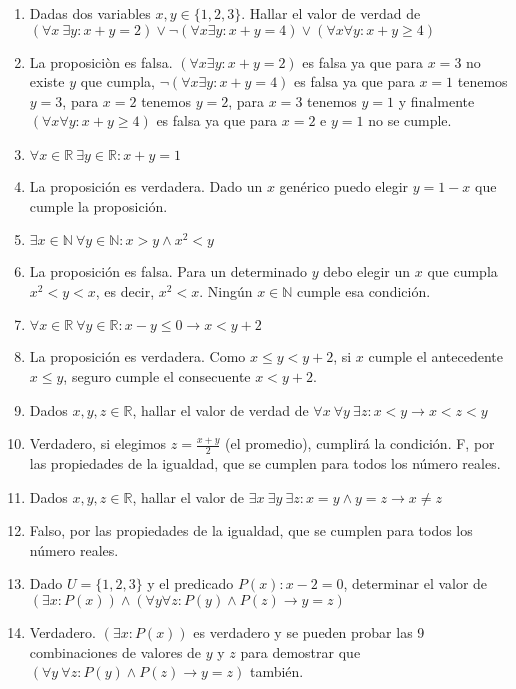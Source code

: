 \documentclass[a4paper]{article}
\newcommand{\answer}{\item[**]}
\newcommand{\then}{\to}
\begin{document}
\begin{enumerate}[resume]
\begin{enumerate} [label=(\alph*)]
		\item Dadas dos variables $x,y \in \{1,2,3\}$. Hallar el valor de verdad de $\left(\forall x ~\exists y: x+y = 2 \right) \lor \neg \left(\forall x \exists y: x+y = 4 \right) \lor \left(\forall x \forall y: x+y \geq  4 \right)$
		\answer La proposiciòn es falsa. $\left(\forall x \exists y: x+y = 2 \right)$ es falsa ya que para $x=3$ no existe $y$ que cumpla, $\neg \left(\forall x \exists y: x+y = 4 \right)$ es falsa ya que para $x=1$ tenemos $y=3$, para $x=2$ tenemos $y=2$, para $x=3$ tenemos $y=1$ y finalmente $\left(\forall x \forall y: x+y \geq  4 \right)$ es falsa ya que para $x=2$ e $y=1$ no se cumple. 

		\item $\forall x \in \mathbb{R} ~\exists y \in \mathbb{R}:  x+y = 1 $ 
		\answer La proposición es verdadera. Dado un $x$ genérico puedo elegir $y=1-x$ que cumple la proposición. 

		\item $\exists x \in \mathbb{N} ~ \forall y \in \mathbb{N}:  x > y  \land   x^2 < y $ 
		\answer La proposición es falsa. Para un determinado $y$ debo elegir un $x$ que cumpla $x^2 < y < x$, es decir, $x^2 < x$. Ningún $x \in \mathbb{N}$ cumple esa condición.

		\item $\forall x \in \mathbb{R} ~\forall y \in \mathbb{R}:  x-y \leq  0  \then   x < y+2 $ 
		\answer La proposición es verdadera. Como $x \leq y < y+2$, si $x$ cumple el antecedente $x \leq  y$, seguro cumple el consecuente $x < y+2$. 

		\item Dados $x,y,z \in \mathbb{R}$, hallar el valor de verdad de $\forall x ~\forall y ~\exists z: x < y  \then   x < z < y $ 
		\answer Verdadero, si elegimos $z=\displaystyle\frac{x+y}{2}$ (el promedio), cumplirá la condición. F, por las propiedades de la igualdad, que se cumplen para todos los número reales.

		\item Dados $x,y,z \in \mathbb{R}$, hallar el valor de $\exists x ~\exists y ~\exists z: x=y \land  y=z \then  x\neq  z $ 
		\answer Falso, por las propiedades de la igualdad, que se cumplen para todos los número reales.

		\item Dado $U = \{1,2,3\}$ y el predicado $P(x): x-2=0$, determinar el valor de $\left(\exists x: P(x)\right)\land\left(\forall y \forall z: P(y) \land P(z) \then y=z \right)$
		\answer Verdadero. $\left(\exists x: P(x)\right)$ es verdadero y se pueden probar las 9 combinaciones de valores de $y$ y $z$ para demostrar  que $\left(\forall y ~\forall z: P(y) \land P(z) \then y=z \right)$ también.


\end{enumerate}
\end{enumerate}
\end{document}
